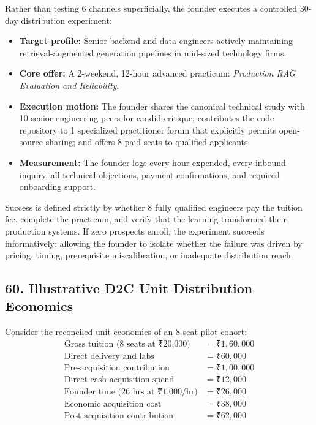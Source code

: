 Rather than testing 6 channels superficially, the founder executes a controlled 30-day distribution experiment:
\begin{itemize}[leftmargin=*,itemsep=1pt]
  \item \textbf{Target profile:} Senior backend and data engineers actively maintaining retrieval-augmented generation pipelines in mid-sized technology firms.
  \item \textbf{Core offer:} A 2-weekend, 12-hour advanced practicum: \textit{Production RAG Evaluation and Reliability}.
  \item \textbf{Execution motion:} The founder shares the canonical technical study with 10 senior engineering peers for candid critique; contributes the code repository to 1 specialized practitioner forum that explicitly permits open-source sharing; and offers 8 paid seats to qualified applicants.
  \item \textbf{Measurement:} The founder logs every hour expended, every inbound inquiry, all technical objections, payment confirmations, and required onboarding support.
\end{itemize}

Success is defined strictly by whether 8 fully qualified engineers pay the tuition fee, complete the practicum, and verify that the learning transformed their production systems. If zero prospects enroll, the experiment succeeds informatively: allowing the founder to isolate whether the failure was driven by pricing, timing, prerequisite miscalibration, or inadequate distribution reach.

\subsection*{60. Illustrative D2C Unit Distribution Economics}

Consider the reconciled unit economics of an 8-seat pilot cohort:
\begin{align*}
  \text{Gross tuition (8 seats at ₹20,000)} &= \text{₹}1,60,000 \\
  \text{Direct delivery and labs} &= \text{₹}60,000 \\
  \hline
  \text{Pre-acquisition contribution} &= \text{₹}1,00,000 \\
  \text{Direct cash acquisition spend} &= \text{₹}12,000 \\
  \text{Founder time (26 hrs at ₹1,000/hr)} &= \text{₹}26,000 \\
  \hline
  \text{Economic acquisition cost} &= \text{₹}38,000 \\
  \text{Post-acquisition contribution} &= \text{₹}62,000
\end{align*}

